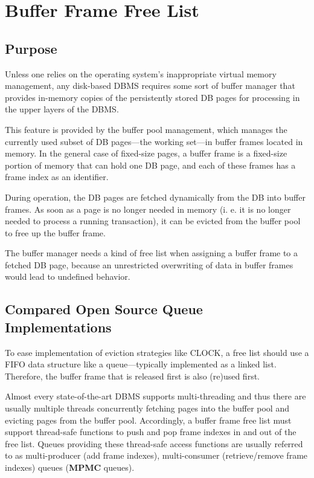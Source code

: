 \chapter[Buffer Frame Free List]{Buffer Frame Free List} \label{ch:free-list}

\section[Purpose]{Purpose}

    Unless one relies on the operating system's inappropriate virtual memory management, any disk-based DBMS requires some sort of buffer manager that provides in-memory copies of the persistently stored DB pages for processing in the upper layers of the DBMS.

    This feature is provided by the buffer pool management, which manages the currently used subset of DB pages---the working set---in buffer frames located in memory. In the general case of fixed-size pages, a buffer frame is a fixed-size portion of memory that can hold one DB page, and each of these frames has a frame index as an identifier.

    During operation, the DB pages are fetched dynamically from the DB into buffer frames. As soon as a page is no longer needed in memory (i. e. it is no longer needed to process a running transaction), it can be evicted from the buffer pool to free up the buffer frame.

    The buffer manager needs a kind of free list when assigning a buffer frame to a fetched DB page, because an unrestricted overwriting of data in buffer frames would lead to undefined behavior.

\section[Compared Open Source Queue Implementations]{Compared Open Source Queue Implementations}

    To ease implementation of eviction strategies like CLOCK, a free list should use a FIFO data structure like a queue---typically implemented as a linked list. Therefore, the buffer frame that is released first is also (re)used first.

    Almost every state-of-the-art DBMS supports multi-threading and thus there are usually multiple threads concurrently fetching pages into the buffer pool and evicting pages from the buffer pool. Accordingly, a buffer frame free list must support thread-safe functions to push and pop frame indexes in and out of the free list. Queues providing these thread-safe access functions are usually referred to as multi-producer (add frame indexes), multi-consumer (retrieve/remove frame indexes) queues (\textbf{MPMC} queues).
	
